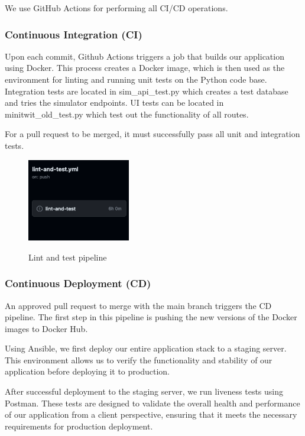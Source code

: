 \documentclass{article}
\begin{document}
We use GitHub Actions for performing all CI/CD operations.

\subsubsection{Continuous Integration (CI)}

Upon each commit, Github Actions triggers a job that builds our application using Docker. This process creates a Docker image, which is then used as the environment for linting and running unit tests on the Python code base. Integration tests are located in sim\_api\_test.py which creates a test database and tries the simulator endpoints.
UI tests can be located in minitwit\_old\_test.py which test out the functionality of all routes.



For a pull request to be merged, it must successfully pass all unit and integration tests.
\begin{figure}[h]
    \includegraphics[width=0.4\textwidth]{images/Lint-and-test_Pipeline.png}
    \label{fig:ci_pipeline}
    \centering
    \caption{Lint and test pipeline}
\end{figure}
    

\subsubsection{Continuous Deployment (CD)}

An approved pull request to merge with the main branch triggers the CD pipeline. The first step in this pipeline is pushing the new versions of the Docker images to Docker Hub. 

Using Ansible, we first deploy our entire application stack to a staging server. This environment allows us to verify the functionality and stability of our application before deploying it to production.

After successful deployment to the staging server, we run liveness tests using Postman. These tests are designed to validate the overall health and performance of our application from a client perspective, ensuring that it meets the necessary requirements for production deployment. 
\end{document}

